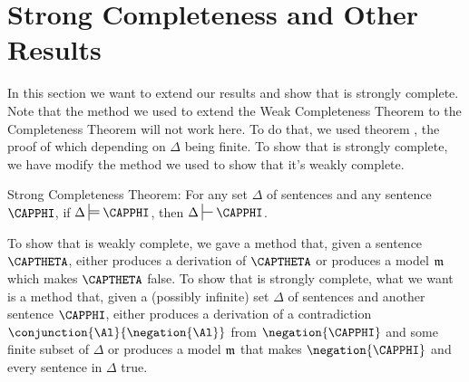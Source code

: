 
\section{Strong Completeness and Other Results}\label{Sec:Proving Strong Completeness}
In this section we want to extend our results and show that \GQD{} is strongly complete.
Note that the method we used to extend the Weak Completeness Theorem to the Completeness Theorem will not work here.
To do that, we used theorem , the proof of which depending on $\Delta$ being finite.  
To show that \GQD{} is strongly complete, we have modify the method we used to show that it's weakly complete.
\begin{THEOREM}{ Strong \GQD{} Completeness Theorem:}
For any set $\Delta$ of \GSL{} sentences and any \GSL{} sentence $\CAPPHI$, if $\Delta\sdtstile{}{}\CAPPHI$, then $\Delta\sststile{}{}\CAPPHI$.
\end{THEOREM}
\noindent{}To show that \GQD{} is weakly complete, we gave a method that, given a sentence $\CAPTHETA$, either produces a derivation of $\CAPTHETA$ or produces a model $\mathfrak{m}$ which makes $\CAPTHETA$ false. 
To show that \GQD{} is strongly complete, what we want is a method that, given a (possibly infinite) set $\Delta$ of sentences and another sentence $\CAPPHI$, either produces a derivation of a contradiction $\conjunction{\Al}{\negation{\Al}}$ from $\negation{\CAPPHI}$ and some finite subset of $\Delta$ or produces a model $\mathfrak{m}$ that makes $\negation{\CAPPHI}$ and every sentence in $\Delta$ true.

